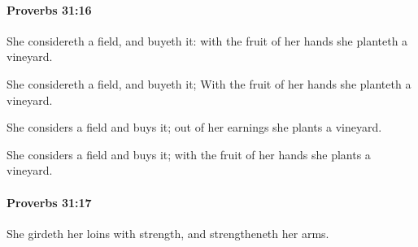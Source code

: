 		\paragraph{Proverbs 31:16} %
			\label{PROVERBS-31-16}

			She considereth a field, and buyeth it: with the fruit of her hands she planteth a vineyard.

			\begin{versebox}
					\item[BHS] 
					\item[ASV] She considereth a field, and buyeth it; With the fruit of her hands she planteth a vineyard.
					\item[NIV] She considers a field and buys it; out of her earnings she plants a vineyard.
					\item[NRSV] She considers a field and buys it; with the fruit of her hands she plants a vineyard.
			\end{versebox}

		\paragraph{Proverbs 31:17} %
			\label{PROVERBS-31-17}

			She girdeth her loins with strength, and strengtheneth her arms.


